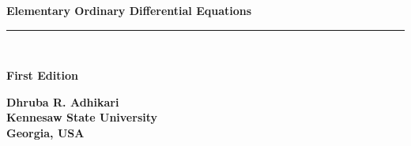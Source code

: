 \documentclass[pagenumber]{book}
\makeatletter
\newcommand{\booksubtitle}{Methods and Applications}
\newcommand{\authorsubtitle}{City, Country}
\newcommand{\bookauthor}{\@author}
\numberwithin{section}{chapter}
\numberwithin{equation}{chapter}
\theoremstyle{definition}
\makeatother
\begin{document}
\begin{titlepage}
\begin{flushleft}

\textbf{\fontsize{14}{25}\selectfont Elementary Ordinary Differential Equations\\}

\par\noindent\rule{\textwidth}{4pt}\\




\begin{flushright}
\textbf{
\Large First Edition}
\end{flushright}
\vspace{\fill}
\begin{flushright}
\textbf{
\LARGE Dhruba  R. Adhikari\\[1ex]
\large Kennesaw State University\\
Georgia, USA
}
\end{flushright}

\vspace{\fill}


\vspace{\fill}

\begin{center}
\end{center}

\end{flushleft}

\end{titlepage}
\restoregeometry
\end{document}
